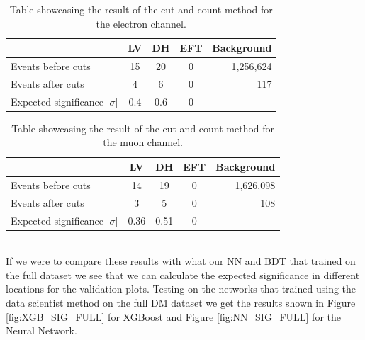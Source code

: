 \documentclass[14pt, a4paper]{book}
\begin{document}
\begin{table}[!h]
    \centering
    \caption[Cut and count significance ee]{Table showcasing the result of the cut and count method for the electron channel.}
    \begin{tabular}{l|c|c|c|r}\midrule\midrule
                                          & LV  & DH  & EFT & Background \\\midrule
         Events before cuts               & 15  & 20  & 0   & 1,256,624    \\
         Events after cuts                & 4   & 6   & 0   & 117 \\
         Expected significance [$\sigma$] & 0.4 & 0.6 & 0   & \\\midrule\midrule
    \end{tabular}
    \label{tab:cutsigee}
\end{table}
\begin{table}[!h]
    \centering
    \caption[Cut and count significance uu]{Table showcasing the result of the cut and count method for the muon channel.}
    \begin{tabular}{l|c|c|c|r}\midrule\midrule
                                          & LV  & DH  & EFT & Background \\\midrule
         Events before cuts               & 14  & 19  & 0   & 1,626,098    \\
         Events after cuts                & 3   & 5   & 0   & 108 \\
         Expected significance [$\sigma$] & 0.36 & 0.51 & 0   & \\\midrule\midrule
    \end{tabular}
    \label{tab:cutsiguu}
\end{table}
\\If we were to compare these results with what our NN and BDT that trained on the full dataset we see that we can calculate the expected significance in different locations for the validation plots. Testing on the networks that trained using the data scientist method on the full DM dataset we get the results shown in Figure \ref{fig:XGB_SIG_FULL} for XGBoost and Figure \ref{fig:NN_SIG_FULL} for the Neural Network.
\end{document}
